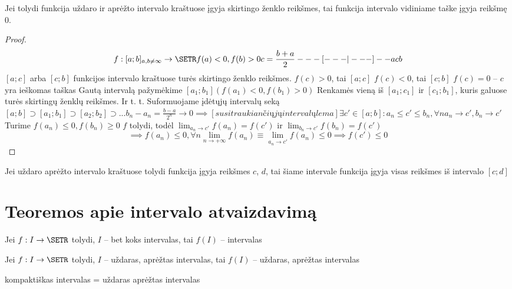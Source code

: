 \begin{prop}
  Jei tolydi funkcija uždaro ir aprėžto intervalo kraštuose įgyja skirtingo
  ženklo reikšmes, tai funkcija intervalo vidiniame taške įgyja reikšmę 0.
  \begin{proof}
    \[
    f : [a; b]_{a, b \neq \infty} \to \SETR f(a) < 0, f(b) > 0
    c = \frac{b + a}{2}
    ---[---|---]-- 
       a   c   b
    \]
    $[a; c]$ arba $[c; b]$ funkcijos intervalo kraštuose turės skirtingo
    ženklo reikšmes.
    $f(c) > 0$, tai $[a; c]$
    $f(c) < 0$, tai $[c; b]$
    $f(c) = 0$ – $c$ yra ieškomas taškas
    Gautą intervalą pažymėkime $[a_1; b_1] (f(a_1) < 0, f(b_1) > 0)$
    Renkamės vieną iš $[a_1; c_1]$ ir $[c_1; b_1]$, kuris galuose turės
    skirtingų ženklų reikšmes.
    Ir t. t.
    Suformuojame įdėtųjų intervalų seką
    $[a; b] \supset [a_1; b_1] \supset [a_2; b_2] \supset ...
    b_n - a_n = \frac{b - a}{2^n} \to 0
    \implies[susitraukiančiųjų intervalų lema] \exists c' \in [a; b] :
    a_n \leq c' \leq b_n, \forall n
    a_n \to c', b_n \to c'$
    Turime $f(a_n) \leq 0, f(b_n) \geq 0$
    $f$ tolydi, todėl $\lim_{a_n \to c'}{f(a_n)} = f(c')$
    ir $\lim_{b_n \to c'}{f(b_n) = f(c')}$
    \[
      \implies f(a_n) \leq 0, \forall n
      \lim_{n \to +\infty}{f(a_n)} \equiv \lim_{a_n \to c'}{f(a_n)} \leq 0
      \implies f(c') \leq 0
    \]
  \end{proof}
\end{prop}

\begin{prop}
  Jei uždaro aprėžto intervalo kraštuose tolydi funkcija įgyja reikšmes $c$, $d$,
  tai šiame intervale funkcija įgyja visas reikšmes iš intervalo $[c; d]$
\end{prop}

\chapter{Teoremos apie intervalo atvaizdavimą}
\begin{prop}
  Jei $f : I \to \SETR$ tolydi, $I$ – bet koks intervalas, tai $f(I)$ – intervalas
\end{prop}
\begin{prop}
  Jei $f : I \to \SETR$ tolydi, $I$ – uždaras, aprėžtas intervalas,
  tai $f(I)$ – uždaras, aprėžtas intervalas
\end{prop}
\begin{defn}
  kompaktiškas intervalas = uždaras aprėžtas intervalas
\end{defn}

